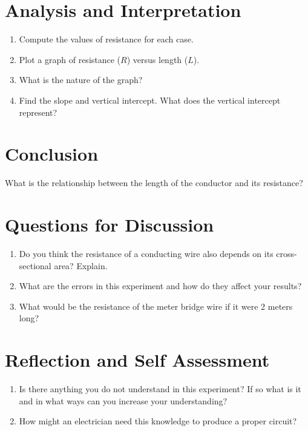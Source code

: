 \section{Analysis and Interpretation}
\begin{enumerate}
\item Compute the values of resistance for each case.
\item Plot a graph of resistance ($R$) versus length ($L$).
\item What is the nature of the graph?
\item Find the slope and vertical intercept. What does the vertical intercept represent?
\end{enumerate}

\section{Conclusion}
What is the relationship between the length of the conductor and its resistance?

\section{Questions for Discussion}
\begin{enumerate}
\item Do you think the resistance of a conducting wire also depends on its cross-sectional area? Explain.
\item What are the errors in this experiment and how do they affect your results?
\item What would be the resistance of the meter bridge wire if it were 2 meters long?
\end{enumerate}

\section{Reflection and Self Assessment}
\begin{enumerate}
\item Is there anything you do not understand in this experiment? If so what is it and in what ways can you increase your understanding?
\item How might an electrician need this knowledge to produce a proper circuit?
\end{enumerate}